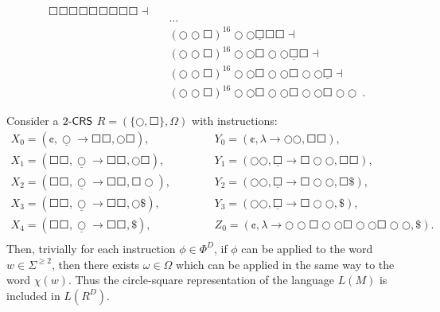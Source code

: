 \begin{eqnarray*}
\Square \Square \Square \Square \Square \Square \Square \Square \Square \dashv\\
& & \ldots\\
& & (\Circle \Circle \Square)^{16} \Circle \Circle \underline{\Square} \Square \Square \dashv\\
& & (\Circle \Circle \Square)^{16} \Circle \Circle \Square \Circle \Circle \underline{\Square} \Square \dashv\\
& & (\Circle \Circle \Square)^{16} \Circle \Circle \Square \Circle \Circle \Square \Circle \Circle \underline{\Square} \dashv\\
& & (\Circle \Circle \Square)^{16} \Circle \Circle \Square \Circle \Circle \Square \Circle \Circle \Square \Circle \Circle\enspace.
\end{eqnarray*}

Consider a $\kCRS[2]$ $R = (\{\Circle, \Square\}, \Omega)$ with instructions:
$$
\begin{array}{ll}
X_0 = (\cent, \underline{\Circle} \to \Square \Square, \Circle \Square),\hspace{5em} &
Y_0 = (\cent, \lambda \to \Circle \Circle, \Square \Square),\\
X_1 = (\Square \Square, \underline{\Circle} \to \Square \Square, \Circle \Square), &
Y_1 = (\Circle \Circle, \underline{\Square} \to \Square \Circle \Circle, \Square \Square),\\
X_2 = (\Square \Square, \underline{\Circle} \to \Square \Square, \Square \Circle), &
Y_2 = (\Circle \Circle, \underline{\Square} \to \Square \Circle \Circle, \Square \$),\\
X_3 = (\Square \Square, \underline{\Circle} \to \Square \Square, \Circle \$), &
Y_3 = (\Circle \Circle, \underline{\Square} \to \Square \Circle \Circle, \$),\\
X_4 = (\Square \Square, \underline{\Circle} \to \Square \Square, \$), &
Z_0 = (\cent, \lambda \to \Circle \Circle \Square \Circle \Circle \Square \Circle \Circle \Square \Circle \Circle, \$).\\
\end{array}
$$
Then, trivially for each instruction $\phi \in \Phi^D$, if $\phi$ can be applied to the word $w \in \Sigma^{\ge 2}$, then there exists $\omega \in \Omega$ which can be applied in the same way to the word $\chi(w)$. Thus the circle-square representation of the language $L(M)$ is included in $L(R^D)$.

